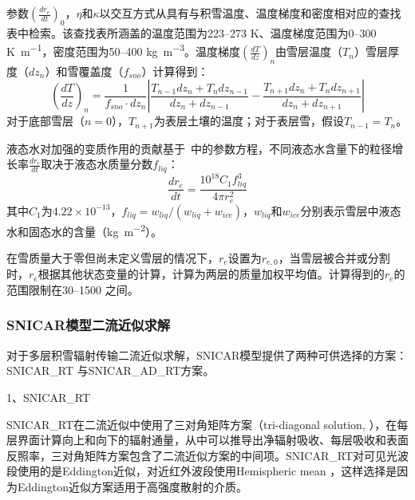 参数$\left( \frac{{dr}_{e}}{dt} \right)_{0}$，$\eta$和$\kappa$以交互方式从具有与积雪温度、温度梯度和密度相对应的查找表中检索。该查找表所涵盖的温度范围为223--273 K、温度梯度范围为0--300 \unit{K.m^{-1}}，密度范围为50--400 \unit{kg.m^{-3}}。温度梯度$\left( \frac{dT}{dz} \right)_{n}$由雪层温度（$T_n$）雪层厚度（$dz_n$）和雪覆盖度（$f_{sno}$）计算得到：
%
\begin{equation}
\left( \frac{dT}{dz} \right)_{n} = \frac{1}{f_{sno}\cdot {dz}_{n}}\left| \frac{T_{n - 1}{dz}_{n} + T_{n}{dz}_{n - 1}}{{dz}_{n} + {dz}_{n - 1}} - \frac{T_{n + 1}{dz}_{n} + T_{n}{dz}_{n + 1}}{{dz}_{n} + {dz}_{n + 1}} \right|
\end{equation}
%
对于底部雪层（$n=0$），$T_{n+1}$为表层土壤的温度；对于表层雪，假设$T_{n-1}=T_n$。

液态水对加强的变质作用的贡献基于~\citet{brun1989InvestigationWetSnowMetamorphism}中的参数方程，不同液态水含量下的粒径增长率$\frac{{dr}_{e}}{dt}$取决于液态水质量分数$f_{liq}$：
%
\begin{equation}
\frac{{dr}_{e}}{dt} = \frac{10^{18}C_{1}f_{liq}^{3}}{4\pi r_{e}^{2}}
\end{equation}
%
其中$C_{1}$为$4.22×10^{-13}$，$f_{liq}=w_{liq}/(w_{liq}+w_{ice})$，$w_{liq}$和$w_{ice}$分别表示雪层中液态水和固态水的含量（\unit {kg.m^{-2}}）。 

在雪质量大于零但尚未定义雪层的情况下，$r_e$设置为$r_{e,0}$，当雪层被合并或分割时，$r_e$根据其他状态变量的计算，计算为两层的质量加权平均值。计算得到的$r_e$的范围限制在30--1500 \unit{}之间。

\subsubsection{SNICAR模型二流近似求解}

对于多层积雪辐射传输二流近似求解，SNICAR模型提供了两种可供选择的方案：SNICAR\_RT \citep{dang2019IntercomparisonImprovementTwostream}与SNICAR\_AD\_RT方案\citep{flanner2021SNICARADv3CommunityTool}。

1、SNICAR\_RT

SNICAR\_RT在二流近似中使用了三对角矩阵方案（tri-diagonal
solution, \citet{toon1989RapidCalculationRadiative}），在每层界面计算向上和向下的辐射通量，从中可以推导出净辐射吸收、每层吸收和表面反照率，三对角矩阵方案包含了二流近似方案的中间项。SNICAR\_RT对可见光波段使用的是Eddington近似\citep{wiscombe1980ModelSpectralAlbedo}，对近红外波段使用Hemispheric mean \citep{toon1989RapidCalculationRadiative}，这样选择是因为Eddington近似方案适用于高强度散射的介质。

